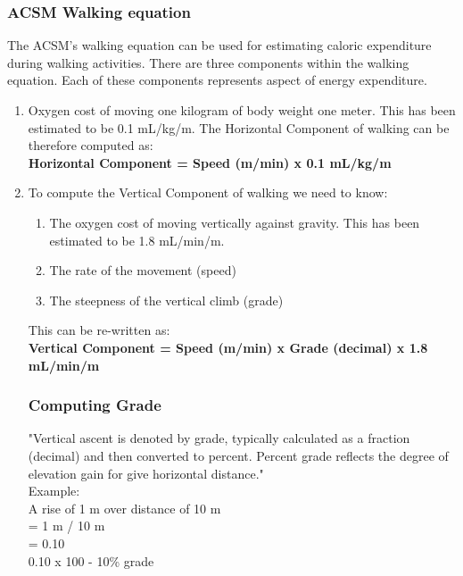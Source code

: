 \documentclass[12pt, a4paper]{report}   %
\begin{document}
\begin{enumerate}
\clearpage
\subsubsection{ACSM Walking equation}
The ACSM's walking equation can be used for estimating caloric expenditure during walking activities. There are three components within the walking equation. Each of these components represents aspect of energy expenditure.

\begin{enumerate}
	\item Oxygen cost of moving one kilogram of body weight one meter. This has been estimated to be 0.1 mL/kg/m. The Horizontal Component of walking can be therefore computed as:\\

\textbf{Horizontal Component = Speed (m/min) x 0.1 mL/kg/m}\\
	
	\item To compute the Vertical Component of walking we need to know:
	\begin{enumerate}
		\item The oxygen cost of moving vertically against gravity. This has been estimated to be 1.8 mL/min/m.
		\item The rate of the movement (speed)
		\item The steepness of the vertical climb (grade)\\
	\end{enumerate}


This can be re-written as:\\

\textbf{Vertical Component = Speed (m/min) x Grade (decimal) x 1.8 mL/min/m}

\subsubsection{Computing Grade}
"Vertical ascent is denoted by grade, typically calculated as a fraction (decimal) and then converted to percent. Percent grade reflects the degree of elevation gain for give horizontal distance."\\

Example:\\

A rise of 1 m over distance of 10 m \\ =
1 m / 10 m \\ = 0.10 \\
0.10 x 100 - 10\% grade\\



\end{enumerate}
\end{enumerate}
\end{document}
